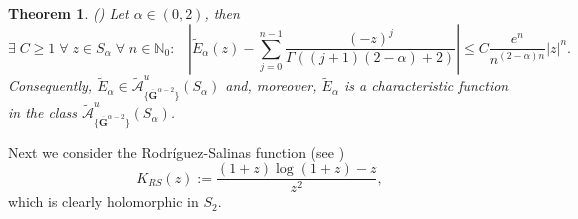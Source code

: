 \documentclass[11pt,a4paper]{article}
\theoremstyle{plain}
\newtheorem{theorem}[proposition]{Theorem}
\theoremstyle{definition}
\newcommand{\NN}{\mathbb{N}}
\newcommand{\red}[1]{{\color{red}#1}}
\newcommand{\G}{\mathbf{G}}
\begin{document}
\begin{theorem}\label{Ealphathm} (\cite[Thm. 5, Thm. 20]{salinas62})
	Let $\alpha\in(0,2)$, then
	\begin{equation*}%
		\exists\;C\ge 1\;\forall\;z\in S_{\alpha}\;\forall\;n\in\NN_0:\;\;\;\left| \widetilde{E}_{\alpha}(z)-\sum_{j=0}^{n-1} \frac{(-z)^j}{\Gamma ((j+1) (2-\alpha)+2)}\right|\leq C \frac{e^n}{n^{(2-\alpha)n}}|z|^n.
	\end{equation*}
	Consequently, $\widetilde{E}_{\alpha}\in\widetilde{\mathcal{A}}^u_{\{\overline{\G}^{\alpha-2}\}}(S_\alpha)$ and,  
    moreover, 
    $\widetilde{E}_{\alpha}$ is a characteristic function in the class $\widetilde{\mathcal{A}}^u_{\{\overline{\G}^{\alpha-2}\}}(S_\alpha)$.
\end{theorem}

Next we consider the Rodr\'{i}guez-Salinas function (see \cite{salinas62})
\begin{equation*}%
	K_{RS}(z):=\frac{(1+z)\log(1+z)-z}{z^2},
\end{equation*}
which is clearly holomorphic in $S_2$.
\end{document}
